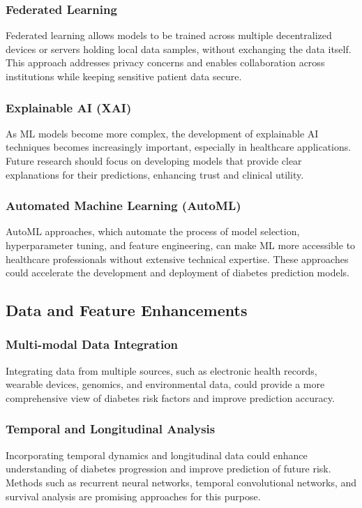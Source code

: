 \documentclass[journal]{IEEEtran}
\begin{document}
\subsubsection{Federated Learning}
Federated learning allows models to be trained across multiple decentralized devices or servers holding local data samples, without exchanging the data itself. This approach addresses privacy concerns and enables collaboration across institutions while keeping sensitive patient data secure.

\subsubsection{Explainable AI (XAI)}
As ML models become more complex, the development of explainable AI techniques becomes increasingly important, especially in healthcare applications. Future research should focus on developing models that provide clear explanations for their predictions, enhancing trust and clinical utility.

\subsubsection{Automated Machine Learning (AutoML)}
AutoML approaches, which automate the process of model selection, hyperparameter tuning, and feature engineering, can make ML more accessible to healthcare professionals without extensive technical expertise. These approaches could accelerate the development and deployment of diabetes prediction models.

\subsection{Data and Feature Enhancements}
\subsubsection{Multi-modal Data Integration}
Integrating data from multiple sources, such as electronic health records, wearable devices, genomics, and environmental data, could provide a more comprehensive view of diabetes risk factors and improve prediction accuracy.

\subsubsection{Temporal and Longitudinal Analysis}
Incorporating temporal dynamics and longitudinal data could enhance understanding of diabetes progression and improve prediction of future risk. Methods such as recurrent neural networks, temporal convolutional networks, and survival analysis are promising approaches for this purpose.
\end{document}
